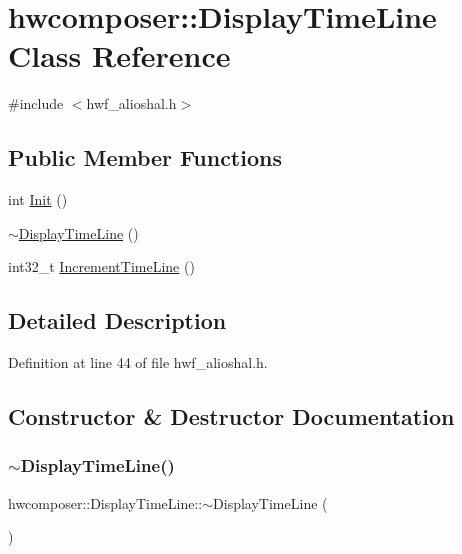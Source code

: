 \hypertarget{classhwcomposer_1_1DisplayTimeLine}{}\section{hwcomposer\+:\+:Display\+Time\+Line Class Reference}
\label{classhwcomposer_1_1DisplayTimeLine}


{\ttfamily \#include $<$hwf\+\_\+alioshal.\+h$>$}

\subsection*{Public Member Functions}
\begin{DoxyCompactItemize}
\item 
int \mbox{\hyperlink{classhwcomposer_1_1DisplayTimeLine_a8f29703a84e1a0bcd0687831d6e59e44}{Init}} ()
\item 
\mbox{\hyperlink{classhwcomposer_1_1DisplayTimeLine_a35b0b3c94f729a0356126ef7a89a81ef}{$\sim$\+Display\+Time\+Line}} ()
\item 
int32\+\_\+t \mbox{\hyperlink{classhwcomposer_1_1DisplayTimeLine_ad42e159c9bc63e507dfdae95a157f156}{Increment\+Time\+Line}} ()
\end{DoxyCompactItemize}


\subsection{Detailed Description}


Definition at line 44 of file hwf\+\_\+alioshal.\+h.



\subsection{Constructor \& Destructor Documentation}
\mbox{\label{classhwcomposer_1_1DisplayTimeLine_a35b0b3c94f729a0356126ef7a89a81ef}} 
\subsubsection{\texorpdfstring{$\sim$\+Display\+Time\+Line()}{~DisplayTimeLine()}}
{\footnotesize\ttfamily hwcomposer\+::\+Display\+Time\+Line\+::$\sim$\+Display\+Time\+Line (\begin{DoxyParamCaption}{ }\end{DoxyParamCaption})\hspace{0.3cm}{\ttfamily [inline]}}



